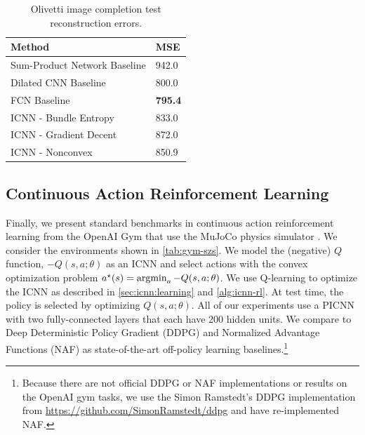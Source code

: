 \begin{table}
\begin{center}
\begin{tabular}{@{}ll@{}}
Method & MSE \\ \hline
Sum-Product Network Baseline \citep{poon2011sum} & 942.0 \\
Dilated CNN Baseline \citep{yu2015multi} & 800.0 \\
FCN Baseline \citep{long2015fully} & \textbf{795.4} \\ \hline
ICNN - Bundle Entropy & 833.0 \\
ICNN - Gradient Decent & 872.0 \\
ICNN - Nonconvex & 850.9 \\
\end{tabular}
\caption{Olivetti image completion test reconstruction errors.}
\label{table:image}
\end{center}
\end{table}

\subsection{Continuous Action Reinforcement Learning}
Finally, we present standard benchmarks in continuous action reinforcement
learning from the OpenAI Gym \citep{brockman2016openai} that use the
MuJoCo physics simulator \citep{todorov2012mujoco}.
We consider the environments shown in \cref{tab:gym-szs}.
We model the (negative) $Q$ function,
$-Q(s,a;\theta)$ as an ICNN and select actions with
the convex optimization problem
$a^\star(s) = \operatorname*{argmin}_a -Q(s,a;\theta)$.
We use Q-learning to optimize the ICNN as described in
\cref{sec:icnn:learning} and
\cref{alg:icnn-rl}.
At test time, the policy is selected by optimizing $Q(s, a; \theta)$.
All of our experiments use a PICNN with two fully-connected
layers that each have 200 hidden units.
We compare to Deep Deterministic Policy Gradient (DDPG) \citep{lillicrap2015continuous}
and Normalized Advantage Functions (NAF) \citep{gu2016continuous}
as state-of-the-art off-policy learning baselines.\footnote{Because there are
not official DDPG or NAF implementations or
results on the OpenAI gym tasks, we use the Simon Ramstedt's
DDPG implementation from \url{https://github.com/SimonRamstedt/ddpg}
and have re-implemented NAF.}

